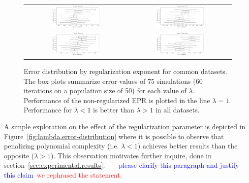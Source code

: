 \documentclass[review,preprint]{elsarticle}
\newcommand{\review}[1]{\textcolor{blue}{~---~#1}}
\newcommand{\revised}[2]{\review{#1}~\textcolor{red}{#2}}
\begin{document}
\begin{figure}[tb]\begin{center}
\begin{tabular}{cc}
\includegraphics[width=0.48\textwidth]{Fig1a.pdf}
&
\includegraphics[width=0.48\textwidth]{Fig1b.pdf}
\\
\includegraphics[width=0.48\textwidth]{Fig1c.pdf}
&
\includegraphics[width=0.48\textwidth]{Fig1d.pdf}
\end{tabular}

\caption{Error distribution by regularization exponent for common datasets. The box plots summarize error values of 75 simulations (60 iterations on a population size of 50) for each value of $\lambda$. Performance of the non-regularized \ac{EPR} is plotted in the line $\lambda = 1$. Performance for $\lambda < 1$ is better than $\lambda > 1$ in all datasets.}
\label{fig:lambda.error-distribution}\label{Abalone_dataset_lambdas}\label{Auto-MPG_dataset_lambdas}

\end{center}\end{figure}

A simple exploration on the effect of the regularization parameter is depicted in Figure~\ref{fig:lambda.error-distribution} where it is possible to observe that penalizing polynomial complexity (i.e. $\lambda < 1$) achieves better results than the opposite ($\lambda > 1$). This observation motivates further inquire, done in section~\ref{sec:experimental.results}.\revised{please clarify this paragraph and justify this claim}{we rephrased the statement.}
\end{document}
